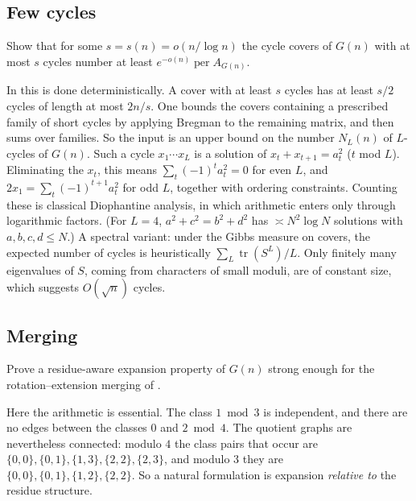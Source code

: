 \subsection{Few cycles}
\begin{problem}[L2]\label{prob:L2}
Show that for some $s=s(n)=o(n/\log n)$ the cycle covers of $G(n)$ with at most $s$
cycles number at least $e^{-o(n)}\operatorname{per}A_{G(n)}$.
\end{problem}
In \cite{Krivelevich} this is done deterministically. A cover with at least $s$ cycles has
at least $s/2$ cycles of length at most $2n/s$. One bounds the covers containing a
prescribed family of short cycles by applying Bregman to the remaining matrix, and then
sums over families. So the input is an upper bound on the number $N_L(n)$ of
$L$-cycles of $G(n)$. Such a cycle $x_1\cdots x_L$ is a solution of
$x_t+x_{t+1}=a_t^2$ ($t$ mod $L$). Eliminating the $x_t$, this means
$\sum_t(-1)^ta_t^2=0$ for even $L$, and $2x_1=\sum_t(-1)^{t+1}a_t^2$ for odd $L$, together with
ordering constraints. Counting these is classical Diophantine analysis, in which
arithmetic enters only through logarithmic factors. (For $L=4$, $a^2+c^2=b^2+d^2$ has
$\asymp N^2\log N$ solutions with $a,b,c,d\le N$.) A spectral variant: under the
Gibbs measure on covers, the expected number of cycles is heuristically
$\sum_L\operatorname{tr}(S^L)/L$. Only finitely many eigenvalues of $S$, coming from
characters of small moduli, are of constant size, which suggests $O(\sqrt n)$ cycles.

\subsection{Merging}\label{subsec:merge}
\begin{problem}[L3]\label{prob:L3}
Prove a residue-aware expansion property of $G(n)$ strong enough for the
rotation--extension merging of \cite{Krivelevich,GlebovKrivelevich}.
\end{problem}
Here the arithmetic is essential. The class $1\bmod 3$ is independent, and there are no
edges between the classes $0$ and $2\bmod 4$. The quotient graphs are nevertheless
connected: modulo $4$ the class pairs that occur are
$\{0,0\},\{0,1\},\{1,3\},\{2,2\},\{2,3\}$, and modulo $3$ they are
$\{0,0\},\{0,1\},\{1,2\},\{2,2\}$. So a natural formulation is expansion
\emph{relative to} the residue structure.

